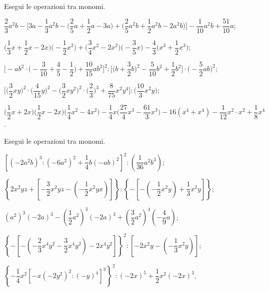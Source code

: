 \begin{esercizio}[\Ast]
 \label{ese:10.35} %
Esegui le operazioni tra monomi.

\begin{enumeratea}
 \item $\dfrac{2}{3}a^{2}b-\bigg[3a-\dfrac{1}{3}a^{2}b-\bigg(\dfrac{2}{5}a+\dfrac{1}{2}a-3a\bigg)+\bigg(\dfrac{2}{5}a^{2}b+\dfrac{1}{2}a^{2}b-2a^{2}b\bigg)\bigg]%
 -\dfrac{1}{10}a^{2}b+\dfrac{51}{10}a$;
 \item $\bigg(\dfrac{1}{3}x+\dfrac{1}{2}x-2x\bigg)\bigg(-{\dfrac{1}{2}x^{2}}\bigg)+\bigg(\dfrac{3}{4}x^{2}-2x^{2}\bigg)\bigg(-{\dfrac{3}{5}x}\bigg)%
 -\dfrac{4}{3}\bigg(x^{3}+\dfrac{1}{2}x^{3}\bigg)$;
 \item 
 $\Bigg[-ab^{2}\cdot\bigg(-{\dfrac{3}{10}}+\dfrac{4}{5}-\dfrac{1}{2}\bigg)+\dfrac{10}{15}ab^{2}\Bigg]^{2}:\bigg[\bigg(b+\dfrac{3}{2}b\bigg)^{2}-\dfrac{5}{10}b^{2}+\dfrac{1}{2}b^{2}\bigg]\cdot\bigg(-{\dfrac{5}{2}ab}\bigg)^{2}$;
 \item $\bigg[\bigg(\dfrac{3}{2}xy\bigg)^{2}\cdot(\dfrac{4}{15}y\bigg)^{2}-\bigg(\dfrac{3}{2}xy^{2}\bigg)^{2}\cdot\bigg(\dfrac{2}{3}\bigg)^{3}%
 +\dfrac{8}{75}x^{2}y^{4}\bigg]:\bigg(\dfrac{10}{3}x^{2}y\bigg)$;
 \item $\bigg(\dfrac{1}{2}x+2x\bigg)\bigg(\dfrac{1}{2}x-2x\bigg)\bigg(\dfrac{1}{4}x^{2}-4x^{2}\bigg)-\dfrac{1}{4}x\bigg(\dfrac{27}{4}x^{3}-\dfrac{61}{3}x^{3}\bigg)%
 -16(x^{4}+x^{4})-\dfrac{1}{12}x^{2}\cdot x^{2}+\dfrac{1}{8}x^{4}$.
\end{enumeratea}
\end{esercizio}

\begin{esercizio}[\Ast]
 \label{ese:10.36} %
Esegui le operazioni tra monomi.

\begin{enumeratea}
 \item $\left[\left(-2a^2b\right)^3:\left(-6a^2\right)^2+\dfrac{1}{4}b(-ab)^2\right]^2:\left(\dfrac{1}{36}a^2b^3\right)$;
 \item $\left\lbrace 2x^2yz+\left[-\dfrac{3}{2}x^2yz-\left(-\dfrac{1}{2}x^2yx\right)\right] \right\rbrace:\left\lbrace-\left[-\left(-\dfrac{1}{2}x^2y\right)+\dfrac{1}{3}x^2y\right] \right\rbrace$;
 \item $\left(a^2\right)^3(-2a)^3-\left(\dfrac{1}{2}a^2\right)^3(-2a)^3+\left(\dfrac{3}{2}a^2\right)^4\left(-\dfrac{4}{9}a\right)$;
 \item $\left\lbrace-\left[-\left(-\dfrac{2}{3}x^4y^2-\dfrac{3}{2}x^4y^2\right)-2x^4y^2\right]\right\rbrace^2:\left[-2x^2y-\left(-\dfrac{1}{3}x^2y\right)\right]$;
 \item $\left\lbrace-\dfrac{1}{4}x^2\left[-x\left(-2y^2\right)^2:(-y)^4\right]^3 \right\rbrace^2:(-2x)^5+\dfrac{1}{2}x^2(-2x)^3$.
\end{enumeratea}
\end{esercizio}

